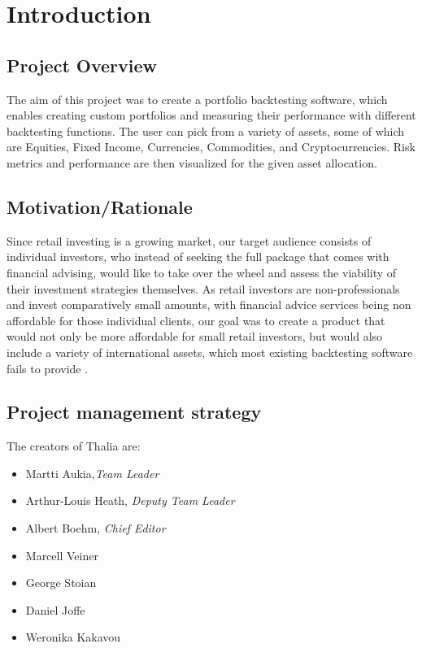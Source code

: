\documentclass[main.tex]{subfiles}
\begin{document}
\section{Introduction}
\subsection {Project Overview}

The aim of this project was to create a portfolio backtesting software, which enables creating custom portfolios and measuring their performance with different backtesting functions. The user can pick from a variety of assets, some of which are Equities, Fixed Income, Currencies, Commodities, and Cryptocurrencies. Risk metrics and performance are then visualized for the given asset allocation.
\subsection{Motivation/Rationale}
Since retail investing is a growing market, our target audience consists of individual investors, who instead of seeking the full package that comes with financial advising, would like to take over the wheel and assess the viability of their investment strategies themselves. As retail investors are non-professionals and invest comparatively small amounts, with financial advice services being non affordable for those individual clients, our goal was to create a product that would not only be more affordable for small retail investors, but would also include a variety of international assets, which most existing backtesting software fails to provide \cite{WP_IBC}.

\subsection{Project management strategy}

The creators of Thalia are:
\begin{itemize}
    \item Martti Aukia,\textit{Team Leader}
    \item Arthur-Louis Heath, \textit{Deputy Team Leader}
	\item Albert Boehm, \textit{Chief Editor}
	\item Marcell Veiner
	\item George Stoian
	\item Daniel Joffe
	\item Weronika Kakavou
\end{itemize}
\end{document}
